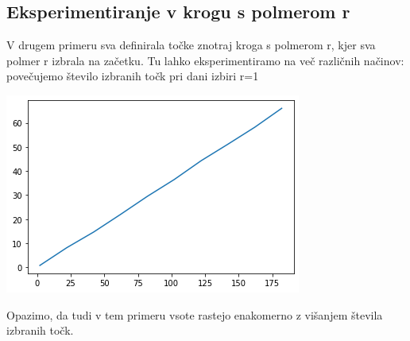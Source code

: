 \documentclass[12pt, a4paper]{article}
\begin{document}
\subsection{Eksperimentiranje v krogu s polmerom r}
V drugem primeru sva definirala točke znotraj kroga s polmerom r, kjer sva polmer r izbrala na začetku. Tu lahko eksperimentiramo na več različnih načinov:
 povečujemo število izbranih točk pri dani izbiri r=1
\begin{center}
\includegraphics{krog_s_danim_polmerom.png}
\end{center}
Opazimo, da tudi v tem primeru vsote rastejo enakomerno z višanjem števila izbranih točk.
	

\newpage
\end{document}
